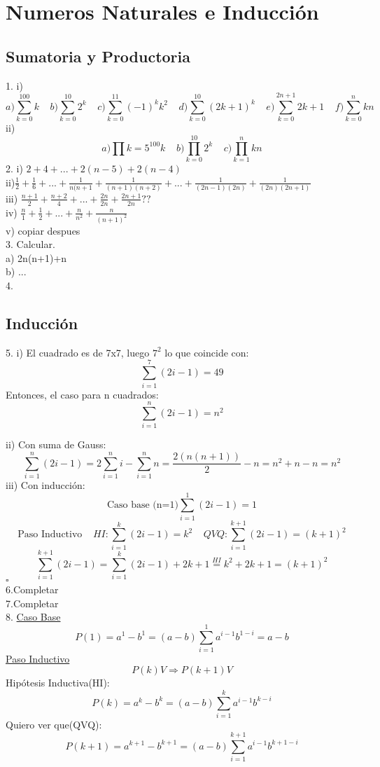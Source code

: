 \documentclass[a4paper,11pt]{article}
\begin{document}
\section{Numeros Naturales e Inducción}
\subsection{Sumatoria y Productoria}
1. i) \[a)\sum_{k=0}^{100} k\;\;\;\;b) \sum_{k=0}^{10} 2^k \;\;\;\;c)\sum_{k=0}^{11} (-1)^k k^2\;\;\;\;d) \sum_{k=0}^{10} (2k+1)^k \;\;\;\;e)\sum_{k=0}^{2n+1} 2k+1 \;\;\;\;f)\sum_{k=0}^{n} kn  \]
ii) \[a)\prod{k=5}^{100} k\;\;\;\;b) \prod_{k=0}^{10} 2^k \;\;\;\;c)\prod_{k=1}^{n} kn \]
2. i) $2+4+...+2(n-5)+2(n-4)$\\
ii)$\frac{1}{2}+\frac{1}{6}+...+\frac{1}{n(n+1}+\frac{1}{(n+1)(n+2)}+...+\frac{1}{(2n-1)(2n)}+\frac{1}{(2n)(2n+1)}$\\
iii) $\frac{n+1}{2}+\frac{n+2}{4}+...+\frac{2n}{2n}+\frac{2n+1}{2n}??$\\
iv) $\frac{n}{1}+\frac{1}{2}+...+\frac{n}{n^2}+\frac{n}{(n+1)^2}$\\
v) copiar despues\\

3. Calcular.\\
a) 2n(n+1)+n\\
b) ...\\
4.\\
\subsection{Inducción}

5. i) El cuadrado es de 7x7, luego $7^2$ lo que coincide con:
\[\text{} \sum_{i=1}^{7} (2i-1) = 49 \]
Entonces, el caso para n cuadrados:
\[\text{} \sum_{i=1}^{n} (2i-1) = n^2 \]

ii) Con suma de Gauss:
\[\sum_{i=1}^{n} (2i-1) =  2\sum_{i=1}^{n} i -  \sum_{i=1}^{n} n = \frac{2(n(n+1))}{2} - n = n^2+n-n = n^2\]
iii) Con inducción:
\[\text{Caso base (n=1)} \sum_{i=1}^{1} (2i-1) = 1 \]
\[\text{Paso Inductivo}\;\;\;\; HI: \sum_{i=1}^{k} (2i-1) = k^2\;\;\;\; QVQ: \sum_{i=1}^{k+1} (2i-1) = (k+1)^2 \]
\[\sum_{i=1}^{k+1} (2i-1) = \sum_{i=1}^{k} (2i-1) + 2k + 1 \stackrel{HI}{=} k^2 + 2k + 1 = (k+1)^2 \]
\hfill$\square $\\
6.Completar\\
7.Completar\\
8. \underline{Caso Base}\\
\[ P(1) = a^1 - b^1 = (a-b)\sum_{i=1}^{1} a^{i-1}b^{1-i} = a-b \]
\underline{Paso Inductivo}\\
\[P(k) V \Rightarrow P(k+1) V\]
Hipótesis Inductiva(HI):\[ P(k) = a^k - b^k = (a-b)\sum_{i=1}^{k} a^{i-1}b^{k-i} \]
Quiero ver que(QVQ):\[ P(k+1) = a^{k+1} - b^{k+1} = (a-b)\sum_{i=1}^{k+1} a^{i-1}b^{k+1-i} \]
\end{document}
